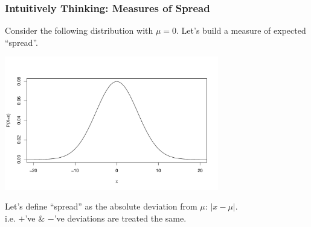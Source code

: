 \documentclass[handout]{beamer}
\newcommand{\blue}[1]{\textcolor{blue2}{#1}}
\begin{document}
%
%
%
%
\begin{frame}
\frametitle{Intuitively Thinking:  Measures of Spread}
Consider the following distribution with $\mu=0$.  Let's build a measure of \blue{expected ``spread''}. 
\begin{center}
\includegraphics[width=0.7\textwidth]{figure/spread1}
\end{center}
\pause Let's define ``spread'' as the \blue{absolute deviation from $\mu$}: $|x - \mu|$.\\
i.e. $+$'ve \& $-$'ve deviations are treated the same.
\end{frame}
\end{document}
